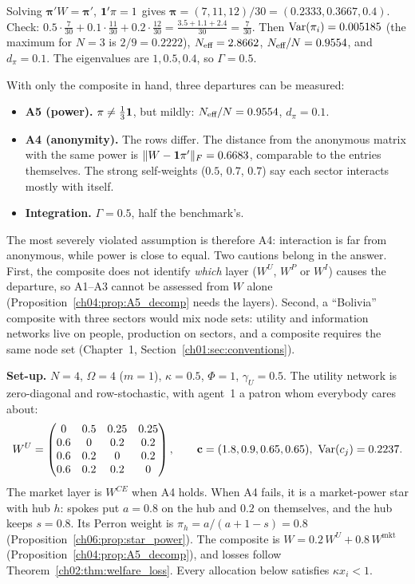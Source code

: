 \documentclass[../solutions_manual.tex]{subfiles}
\begin{document}
 Solving $\boldsymbol\pi'W = \boldsymbol\pi'$, $\mathbf{1}'\pi = 1$ gives $\boldsymbol\pi = (7, 11, 12)/30 = (0.2333, 0.3667, 0.4)$. Check: $0.5\cdot\frac{7}{30} + 0.1\cdot\frac{11}{30} + 0.2\cdot\frac{12}{30} = \frac{3.5 + 1.1 + 2.4}{30} = \frac{7}{30}$. Then $\operatorname{Var}(\pi_i) = 0.005185$ (the maximum for $N = 3$ is $2/9 = 0.2222$), $N_{\text{eff}} = 2.8662$, $N_{\text{eff}}/N = 0.9554$, and $d_\pi = 0.1$. The eigenvalues are $1, 0.5, 0.4$, so $\Gamma = 0.5$.

 With only the composite in hand, three departures can be measured:
\begin{itemize}
\item \textbf{A5 (power).} $\pi \neq \frac13\mathbf{1}$, but mildly: $N_{\text{eff}}/N = 0.9554$, $d_\pi = 0.1$.
\item \textbf{A4 (anonymity).} The rows differ. The distance from the anonymous matrix with the same power is $\|W - \mathbf{1}\pi'\|_F = 0.6683$, comparable to the entries themselves. The strong self-weights ($0.5$, $0.7$, $0.7$) say each sector interacts mostly with itself.
\item \textbf{Integration.} $\Gamma = 0.5$, half the benchmark's.
\end{itemize}
The most severely violated assumption is therefore A4: interaction is far from anonymous, while power is close to equal. Two cautions belong in the answer. First, the composite does not identify \emph{which} layer ($W^U$, $W^P$ or $W^I$) causes the departure, so A1--A3 cannot be assessed from $W$ alone (Proposition~\ref{ch04:prop:A5_decomp} needs the layers). Second, a ``Bolivia'' composite with three sectors would mix node sets: utility and information networks live on people, production on sectors, and a composite requires the same node set (Chapter~1, Section~\ref{ch01:sec:conventions}).


\textbf{Set-up.} $N = 4$, $\Omega = 4$ ($m = 1$), $\kappa = 0.5$, $\Phi = 1$, $\gamma_U = 0.5$. The utility network is zero-diagonal and row-stochastic, with agent~1 a patron whom everybody cares about:
\[
W^U = \begin{pmatrix} 0 & 0.5 & 0.25 & 0.25\\ 0.6 & 0 & 0.2 & 0.2\\ 0.6 & 0.2 & 0 & 0.2\\ 0.6 & 0.2 & 0.2 & 0\end{pmatrix}, \qquad \mathbf c = (1.8, 0.9, 0.65, 0.65),\ \Var(c_j) = 0.2237 .
\]
The market layer is $W^{CE}$ when A4 holds. When A4 fails, it is a market-power star with hub $h$: spokes put $a = 0.8$ on the hub and $0.2$ on themselves, and the hub keeps $s = 0.8$. Its Perron weight is $\pi_h = a/(a+1-s) = 0.8$ (Proposition~\ref{ch06:prop:star_power}). The composite is $W = 0.2\,W^U + 0.8\,W^{\text{mkt}}$ (Proposition~\ref{ch04:prop:A5_decomp}), and losses follow Theorem~\ref{ch02:thm:welfare_loss}. Every allocation below satisfies $\kappa x_i < 1$.
\end{document}
